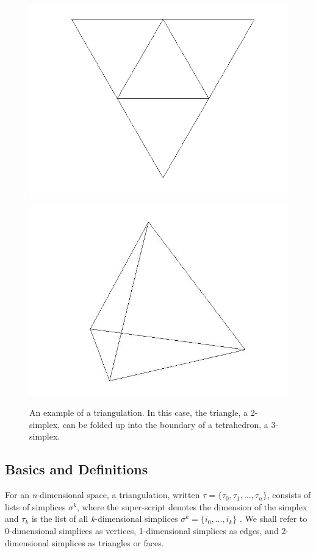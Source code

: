 \documentclass[12pt]{article}
\begin{document}
\begin{figure}
\includegraphics[scale = 0.5]{Pictures/flattetrahedron.png}
\includegraphics[scale = 0.3]{Pictures/tetrahedron.jpg}
\caption{An example of a triangulation. In this case, the triangle, a 2-simplex, can be folded up into the boundary of a tetrahedron, a 3-simplex.}
\end{figure}

\subsection{Basics and Definitions}
\label{BaD}

\noindent For an \textit{n}-dimensional space, a triangulation, written $\tau = \{\tau_0, \tau_1, ... , \tau_n\}$, consists of lists of simplices $\sigma^k$, where the super-script denotes the dimension of the simplex and $\tau_k$ is the list of all \textit{k}-dimensional simplices $\sigma^k = \{i_0, ... , i_k\}$ \cite{Dave}. We shall refer to 0-dimensional simplices as vertices, 1-dimensional simplices as edges, and 2-dimensional simplices as triangles or faces.\newline
\end{document}
